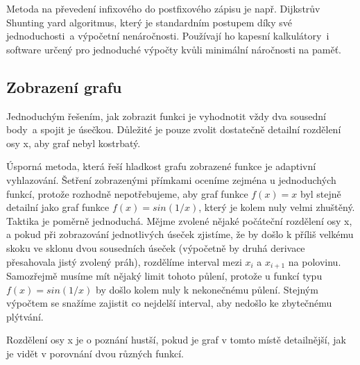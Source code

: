 \documentclass[11pt]{article}
\begin{document}
Metoda na převedení infixového do postfixového zápisu je např. Dijkstrův
Shunting yard algoritmus\cite{wikiShunting}\cite{shewchuk}, který je
standardním postupem díky své jednoduchosti~a výpočetní nenáročnosti. Používají
ho kapesní kalkulátory~i software určený pro jednoduché výpočty kvůli minimální
náročnosti na paměť.



\subsection{Zobrazení grafu}
Jednoduchým řešením, jak zobrazit funkci je vyhodnotit vždy dva sousední body~a
spojit je úsečkou. Důležité je pouze zvolit dostatečně detailní rozdělení osy
x, aby graf nebyl kostrbatý.

Úsporná metoda, která řeší hladkost grafu zobrazené funkce je adaptivní
vyhlazování. Šetření zobrazenými přímkami oceníme zejména u jednoduchých
funkcí, protože rozhodně nepotřebujeme, aby graf funkce $f(x) = x$ byl stejně
detailní jako graf funkce $f(x) = sin(1/x)$, který je kolem nuly velmi
zhuštěný. Taktika je poměrně jednoduchá. Mějme zvolené nějaké počáteční
rozdělení osy x, a pokud při zobrazování jednotlivých úseček zjistíme, že by
došlo k příliš velkému skoku ve sklonu dvou sousedních úseček (výpočetně by
druhá derivace přesahovala jistý zvolený práh), rozdělíme interval mezi $x_i$
a $x_{i + 1}$ na polovinu. Samozřejmě musíme mít nějaký limit tohoto půlení,
protože u funkcí typu $f(x) = sin(1/x)$ by došlo kolem nuly k nekonečnému
půlení. Stejným výpočtem se snažíme zajistit co nejdelší interval, aby nedošlo
ke zbytečnému plýtvání. 

Rozdělení osy x je o poznání hustší, pokud je graf v tomto místě detailnější,
jak je vidět v porovnání dvou různých funkcí.
\end{document}
